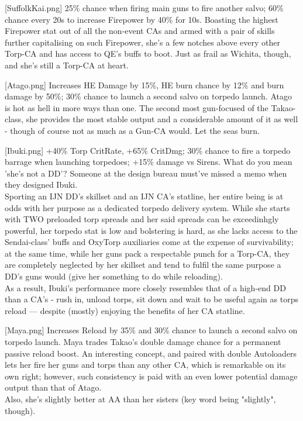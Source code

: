 [SuffolkKai.png]
{25\% chance when firing main guns to fire another salvo; 60\% chance every 20s to increase Firepower by 40\% for 10s.}
{}
{Boasting the highest Firepower stat out of all the non-event CAs and armed with a pair of skills further capitalising on such Firepower, she's a few notches above every other Torp-CA and has access to QE's buffs to boot. Just as frail as Wichita, though, and she's still a Torp-CA at heart.}
 
[Atago.png]
{Increases HE Damage by 15\%, HE burn chance by 12\% and burn damage by 50\%; 30\% chance to launch a second salvo on torpedo launch.}
{}
{Atago is hot as hell in more ways than one. The second most gun-focused of the Takao-class, she provides the most stable output and a considerable amount of it as well - though of course not as much as a Gun-CA would. Let the seas burn.}

[Ibuki.png]
{+40\% Torp CritRate, +65\% CritDmg; 30\% chance to fire a torpedo barrage when launching torpedoes; +15\% damage vs Sirens.}
{What do you mean 'she's not a DD'?}
{Someone at the design bureau must've missed a memo when they designed Ibuki. \\
Sporting an IJN DD's skillset and an IJN CA's statline, her entire being is at odds with her purpose as a dedicated torpedo delivery system. While she starts with TWO preloaded torp spreads and her said spreads can be exceedinhgly powerful, her torpedo stat is low and bolstering is hard, as she lacks access to the Sendai-class' buffs and OxyTorp auxiliaries come at the expense of survivability; at the same time, while her guns pack a respectable punch for a Torp-CA, they are completely neglected by her skillset and tend to fulfil the same purpose a DD's guns would (give her something to do while reloading).\\
As a result, Ibuki's performance more closely resembles that of a high-end DD than a CA's - rush in, unload torps, sit down and wait to be useful again as torps reload --- despite (mostly) enjoying the benefits of her CA statline.}

[Maya.png]
{Increases Reload by 35\% and 30\% chance to launch a second salvo on torpedo launch.}
{}
{Maya trades Takao's double damage chance for a permanent passive reload boost. An interesting concept, and paired with double Autoloaders lets her fire her guns and torps than any other CA, which is remarkable on its own right; however, such consistency is paid with an even lower potential damage output than that of Atago.\\
Also, she's slightly better at AA than her sisters (key word being "slightly", though).}

